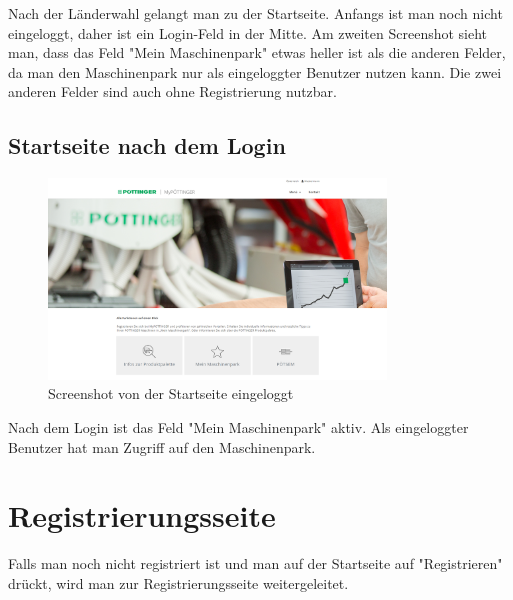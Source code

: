 Nach der Länderwahl gelangt man zu der Startseite. Anfangs ist man noch nicht eingeloggt, daher ist ein Login-Feld in der Mitte. Am zweiten Screenshot sieht man, dass das Feld "Mein Maschinenpark" etwas heller ist als die anderen Felder, da man den Maschinenpark nur als eingeloggter Benutzer nutzen kann. Die zwei anderen Felder sind auch ohne Registrierung nutzbar.
 
\subsection{Startseite nach dem Login}
\begin{figure}[H]
	\centerline{
		\includegraphics[width=0.8\textwidth]{./grafiken/erm_home_logged_in.png}
	}
	\vskip0pt
	\caption{Screenshot von der Startseite eingeloggt} \label{fig:homeLoggedIn}
\end{figure}
Nach dem Login ist das Feld "Mein Maschinenpark" aktiv. Als eingeloggter Benutzer hat man Zugriff auf den Maschinenpark. 
\section{Registrierungsseite}
Falls man noch nicht registriert ist und man auf der Startseite auf "Registrieren" drückt, wird man zur Registrierungsseite weitergeleitet.
